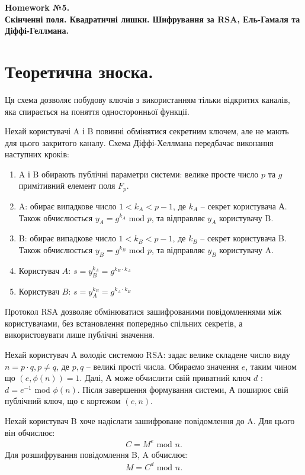 \documentclass{../../test-template}
\begin{document}
\begin{center}
    \textbf{\Huge{Homework №5.} \\ \large Скінченні поля. Квадратичні лишки. Шифрування за RSA, Ель-Гамаля та Діффі-Геллмана.}
\end{center}

\section*{Теоретична зноска.}

\begin{tcolorbox}[breakable, colback=gray!10!white,fonttitle=\bfseries,colframe=purple!30!black,title=Diffie-Hellman]
Ця схема дозволяє побудову ключів з використанням
тільки відкритих каналів, яка спирається на поняття односторонньої функції. 

Нехай користувачі A і B повинні обмінятися секретним ключем, але не
мають для цього закритого каналу. Схема Діффі-Хеллмана передбачає виконання наступних кроків:
\begin{enumerate}
    \item A і B обирають публічні параметри системи: велике просте число $p$ та $g$ примітивний елемент поля $F_p$. 
    \item A: обирає випадкове число $1<k_A<p-1$, де $k_A$ -- секрет користувача А. Також обчислюється $y_A=g^{k_A}\text{ mod } p$, та відправляє $y_A$ користувачу B.
    \item B: обирає випадкове число $1<k_B<p-1$, де $k_B$ -- секрет користувача B. Також обчислюється $y_B=g^{k_B}\text{ mod } p$, та відправляє $y_B$ користувачу A.
    \item Користувач $A$: $s=y_B^{k_A}=g^{k_B\cdot k_A}$
    \item Користувач $B$: $s=y_A^{k_B}=g^{k_A\cdot k_B}$
\end{enumerate}
\end{tcolorbox}

\begin{tcolorbox}[breakable, colback=gray!10!white,fonttitle=\bfseries,colframe=purple!50!black,title=RSA]
Протокол RSA дозволяє обмінюватися зашифрованими повідомленнями між користувачами, без встановлення попередньо спільних секретів, а використовувати лише публічні значення. 

Нехай користувач A володіє системою RSA: задає велике складене число виду $n=p\cdot q, p\neq q$, де $p,q$ -- великі прості числа. Обираємо значення $e$, таким чином що $(e,\phi(n))=1$. Далі, А може обчислити свій приватний ключ $d$ : $d=e^{-1}\text{ mod } \phi(n).$ Після завершення формування системи, А поширює свій публічний ключ, що є кортежом $(e,n)$.

Нехай користувач B хоче надіслати зашифроване повідомлення до A. Для цього він обчислює:
\begin{align*}
    C=M^e\text{ mod } n.
\end{align*}
Для розшифрування повідомлення B, A обчислює:
\begin{align*}
    M=C^d\text{ mod } n.
\end{align*}
\end{tcolorbox}
\end{document}
